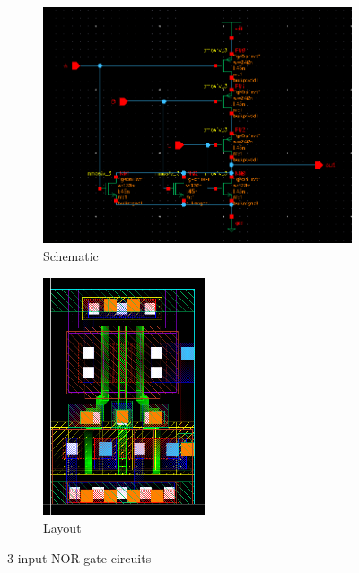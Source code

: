 \begin{figure}[H]
    \begin{subfigure}{0.6\textwidth}
        \centering
        \includegraphics[width=\textwidth,height=7cm,keepaspectratio]{./figures/nor3/schematic.png}
        \caption{Schematic}\label{fig:nor3schematic}
    \end{subfigure}
    \hfill
    \begin{subfigure}{0.4\textwidth}
        \centering
        \includegraphics[width=\textwidth,height=7cm,keepaspectratio]{./figures/nor3/layout.png}
        \caption{Layout}\label{fig:nor3layout}
    \end{subfigure}
    \caption{3-input NOR gate circuits}
    \end{figure}
    
